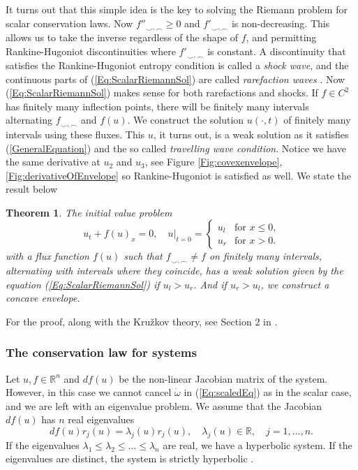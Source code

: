 \documentclass[10pt]{article}
\newtheorem{theorem}{Theorem}[section]
\numberwithin{equation}{section}
\begin{document}
 It turns out that this simple idea is the key to solving the Riemann problem for scalar conservation laws. Now $f''_{\smile, \frown} \geq 0$ and $f'_{\smile, \frown} $ is non-decreasing. This allows us to take the inverse regardless of the shape of $f$, and permitting Rankine-Hugoniot discontinuities where $f'_{\smile, \frown} $ is constant. A discontinuity that satisfies the Rankine-Hugoniot entropy condition is called a \textit{shock wave}, and the continuous parts of (\ref{Eq:ScalarRiemannSol}) are called \textit{rarefaction waves} \cite{HoldenH.Helge2015Ftfh}. Now (\ref{Eq:ScalarRiemannSol}) makes sense for both rarefactions and shocks. If $f \in C^2$ has finitely many inflection points, there will be finitely many intervals alternating $f_{\smile, \frown} $ and $f(u)$. We construct the solution $u(\cdot, t)$ of finitely many intervals using these fluxes. This $u$, it turns out, is a weak solution as it satisfies (\ref{GeneralEquation}) and the so called \textit{travelling wave condition}. Notice we have the same derivative at $u_2$ and $u_3$, see Figure \ref{Fig:covexenvelope}, \ref{Fig:derivativeOfEnvelope} so Rankine-Hugoniot is satisfied as well. We state the result below
\begin{theorem}
The initial value problem
\begin{equation*}
    u_t + f(u)_x = 0,  \quad u|_{t = 0 } = \begin{cases} u_l & \text{for $x \leq 0$,}\\ u_r & \text{for $x>0$.} 
 \end{cases}
\end{equation*}
 with a flux function $f(u)$ such that $f_{\smile,\frown} \neq f$ on finitely many intervals, alternating with intervals where they coincide, has a weak solution given by the equation (\ref{Eq:ScalarRiemannSol}) if $u_l > u_r$. And if $u_r > u_l$, we construct a concave envelope.  
\label{RP_Kružkov_sol}
\end{theorem} For the proof, along with the Kružkov theory, see Section $2$ in \cite{HoldenH.Helge2015Ftfh}.



\subsubsection{The conservation law for systems }
Let $u, f \in \mathbb{R}^n$ and  $ df(u)$ be the non-linear Jacobian matrix of the system. However, in this case we cannot cancel $ \dot \omega$ in (\ref{Eq:scaledEq}) as in the scalar case, and we are left with an eigenvalue problem. We assume that the Jacobian $df(u)$ has $n$ real eigenvalues 
\begin{equation}
    df(u)r_j(u) = \lambda_j(u)r_j(u), \quad \lambda_j(u) \in \mathbb{R}, \quad j = 1, \dots, n. 
    \label{Eq:Eig.val problem}
\end{equation}
If the eigenvalues $\lambda_1 \leq \lambda_2 \leq \dots \leq \lambda_n $ are real, we have a hyperbolic system. If the eigenvalues are distinct, the system is strictly hyperbolic \cite{HoldenH.Helge2015Ftfh}. 
\end{document}
